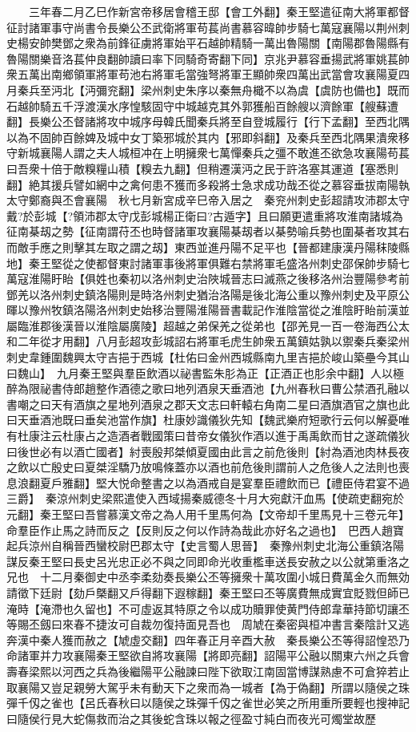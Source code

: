 　　三年春二月乙巳作新宮帝移居會稽王邸【會工外翻】秦王堅遣征南大將軍都督征討諸軍事守尚書令長樂公丕武衛將軍苟萇尚書慕容暐帥步騎七萬寇襄陽以荆州刺史楊安帥樊鄧之衆為前鋒征虜將軍始平石越帥精騎一萬出魯陽關【南陽郡魯陽縣有魯陽關樂音洛萇仲良翻帥讀曰率下同騎奇寄翻下同】京兆尹慕容垂揚武將軍姚萇帥衆五萬出南鄉領軍將軍苟池右將軍毛當強弩將軍王顯帥衆四萬出武當會攻襄陽夏四月秦兵至沔北【沔彌兖翻】梁州刺史朱序以秦無舟檝不以為虞【虞防也備也】既而石越帥騎五千浮渡漢水序惶駭固守中城越克其外郭獲船百餘艘以濟餘軍【艘蘇遭翻】長樂公丕督諸將攻中城序母韓氏聞秦兵將至自登城履行【行下孟翻】至西北隅以為不固帥百餘婢及城中女丁築邪城於其内【邪即斜翻】及秦兵至西北隅果潰衆移守新城襄陽人謂之夫人城桓冲在上明擁衆七萬憚秦兵之彊不敢進丕欲急攻襄陽苟萇曰吾衆十倍于敵糗糧山積【糗去九翻】但稍遷漢沔之民于許洛塞其運道【塞悉則翻】絶其援兵譬如網中之禽何患不獲而多殺將士急求成功哉丕從之慕容垂拔南陽執太守鄭裔與丕會襄陽　秋七月新宮成辛巳帝入居之　秦兖州刺史彭超請攻沛郡太守戴?於彭城【?領沛郡太守戊彭城楊正衛曰?古遁字】且曰願更遣重將攻淮南諸城為征南棊刼之勢【征南謂苻丕也時督諸軍攻襄陽棊刼者以棊勢喻兵勢也圍棊者攻其右而敵手應之則擊其左取之謂之刼】東西並進丹陽不足平也【晉都建康漢丹陽秣陵縣地】秦王堅從之使都督東討諸軍事後將軍俱難右禁將軍毛盛洛州刺史邵保帥步騎七萬寇淮陽盱眙【俱姓也秦初以洛州刺史治陜城晉志曰滅燕之後移洛州治豐陽參考前鄧羌以洛州刺史鎮洛陽則是時洛州刺史猶治洛陽是後北海公重以豫州刺史及平原公暉以豫州牧鎮洛陽洛州刺史始移治豐陽淮陽晉書載記作淮陰當從之淮陰盱眙前漢並屬臨淮郡後漢晉以淮陰屬廣陵】超越之弟保羌之從弟也【邵羌見一百一卷海西公太和二年從才用翻】八月彭超攻彭城詔右將軍毛虎生帥衆五萬鎮姑孰以禦秦兵秦梁州刺史韋鍾圍魏興太守吉挹于西城【杜佑曰金州西城縣南九里吉挹於峻山築壘今其山曰魏山】　九月秦王堅與羣臣飲酒以祕書監朱肜為正【正酒正也肜余中翻】人以極醉為限祕書侍郎趙整作酒德之歌曰地列酒泉天垂酒池【九州春秋曰曹公禁酒孔融以書嘲之曰天有酒旗之星地列酒泉之郡天文志曰軒轅右角南二星曰酒旗酒官之旗也此曰天垂酒池既曰垂矣池當作旗】杜康妙識儀狄先知【魏武樂府短歌行云何以解憂唯有杜康注云杜康占之造酒者戰國策曰昔帝女儀狄作酒以進于禹禹飲而甘之遂疏儀狄曰後世必有以酒亡國者】紂喪殷邦桀傾夏國由此言之前危後則【紂為酒池肉林長夜之飲以亡殷史曰夏桀淫驕乃放鳴條蓋亦以酒也前危後則謂前人之危後人之法則也喪息浪翻夏戶雅翻】堅大悦命整書之以為酒戒自是宴羣臣禮飲而已【禮臣侍君宴不過三爵】　秦涼州刺史梁熙遣使入西域揚秦威德冬十月大宛獻汗血馬【使疏吏翻宛於元翻】秦王堅曰吾嘗慕漢文帝之為人用千里馬何為【文帝却千里馬見十三卷元年】命羣臣作止馬之詩而反之【反則反之何以作詩為哉此亦好名之過也】　巴西人趙寶起兵涼州自稱晉西蠻校尉巴郡太守【史言蜀人思晉】　秦豫州刺史北海公重鎮洛陽謀反秦王堅曰長史呂光忠正必不與之同即命光收重檻車送長安赦之以公就第重洛之兄也　十二月秦御史中丞李柔劾奏長樂公丕等擁衆十萬攻圍小城日費萬金久而無効請徵下廷尉【劾戶槩翻又戶得翻下遐稼翻】秦王堅曰丕等廣費無成實宜貶戮但師已淹時【淹滯也久留也】不可虛返其特原之令以成功贖罪使黄門侍郎韋華持節切讓丕等賜丕劔曰來春不捷汝可自裁勿復持面見吾也　周虓在秦密與桓冲書言秦陰計又逃奔漢中秦人獲而赦之【虓虛交翻】四年春正月辛酉大赦　秦長樂公丕等得詔惶恐乃命諸軍并力攻襄陽秦王堅欲自將攻襄陽【將即亮翻】詔陽平公融以關東六州之兵會壽春梁熙以河西之兵為後繼陽平公融諫曰陛下欲取江南固當博謀熟慮不可倉猝若止取襄陽又豈足親勞大駕乎未有動天下之衆而為一城者【為于偽翻】所謂以隨侯之珠彈千仭之雀也【呂氏春秋曰以隨侯之珠彈千仭之雀世必笑之所用重所要輕也搜神記曰隨侯行見大蛇傷救而治之其後蛇含珠以報之徑盈寸純白而夜光可燭堂故歷